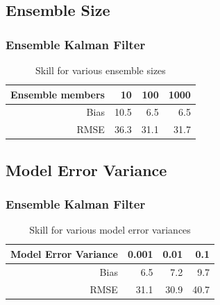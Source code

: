 \documentclass[mathserif]{beamer}
\begin{document}
\subsection{Ensemble Size}

\begin{frame}
\begin{center}
\frametitle{Ensemble Kalman Filter}
\begin{table}
\begin{tabular}{rrrr}
Ensemble members & 10 & 100 & 1000 \\
\hline
Bias & 10.5 & 6.5 & 6.5 \\
RMSE & 36.3 & 31.1 & 31.7
\end{tabular}
\caption{Skill for various ensemble sizes}
\end{table}
\end{center}
\end{frame}

\subsection{Model Error Variance}

\begin{frame}
\begin{center}
\frametitle{Ensemble Kalman Filter}
\begin{table}
\begin{tabular}{rrrr}
Model Error Variance & 0.001 & 0.01 & 0.1 \\
\hline
Bias & 6.5 & 7.2 & 9.7\\
RMSE & 31.1 & 30.9 & 40.7
\end{tabular}
\caption{Skill for various model error variances}
\end{table}
\end{center}
\end{frame}

%
%
\end{document}
